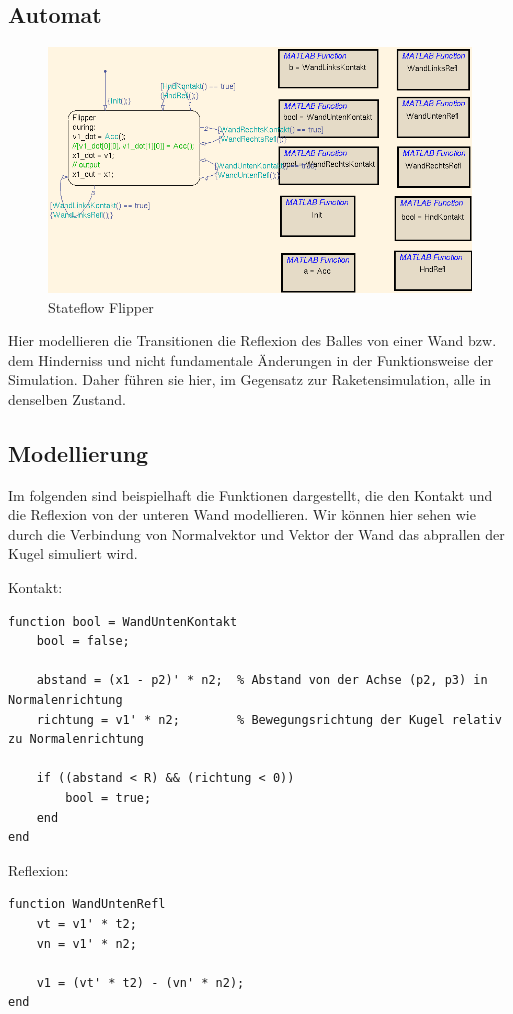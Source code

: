 \documentclass[10pt]{scrartcl}
\begin{document}
	\subsection{Automat}	
	\begin{figure}[htbp]
		\centering
		\includegraphics[scale=0.55]{ScreenshotFlipperAutomat.png}
		\caption{Stateflow Flipper}
		\label{pic:stateflowFlipper}
	\end{figure}
	Hier modellieren die Transitionen die Reflexion des Balles von einer Wand bzw. dem Hinderniss und nicht fundamentale Änderungen in der Funktionsweise der Simulation. Daher führen sie hier, im Gegensatz zur Raketensimulation, alle in denselben Zustand.		
		
		
		
	\subsection{Modellierung}
	Im folgenden sind beispielhaft die Funktionen dargestellt, die den Kontakt und die Reflexion von der unteren Wand modellieren. Wir können hier sehen wie durch die Verbindung von Normalvektor und Vektor der Wand das abprallen der Kugel simuliert wird.
	
	Kontakt:
	\begin{lstlisting}[tabsize=2, frame=single, label=Stiff, caption={WandUntenKontakt}]
	function bool = WandUntenKontakt
    bool = false;
    
    abstand = (x1 - p2)' * n2;  % Abstand von der Achse (p2, p3) in Normalenrichtung
    richtung = v1' * n2;        % Bewegungsrichtung der Kugel relativ zu Normalenrichtung
    
    if ((abstand < R) && (richtung < 0))
        bool = true;
    end
end
	\end{lstlisting}		

Reflexion:
\begin{lstlisting}[tabsize=2, frame=single, label=Stiff, caption={WandUntenReflexion}]
	function WandUntenRefl
    vt = v1' * t2;
    vn = v1' * n2;
    
    v1 = (vt' * t2) - (vn' * n2);
end
	\end{lstlisting}
\end{document}

